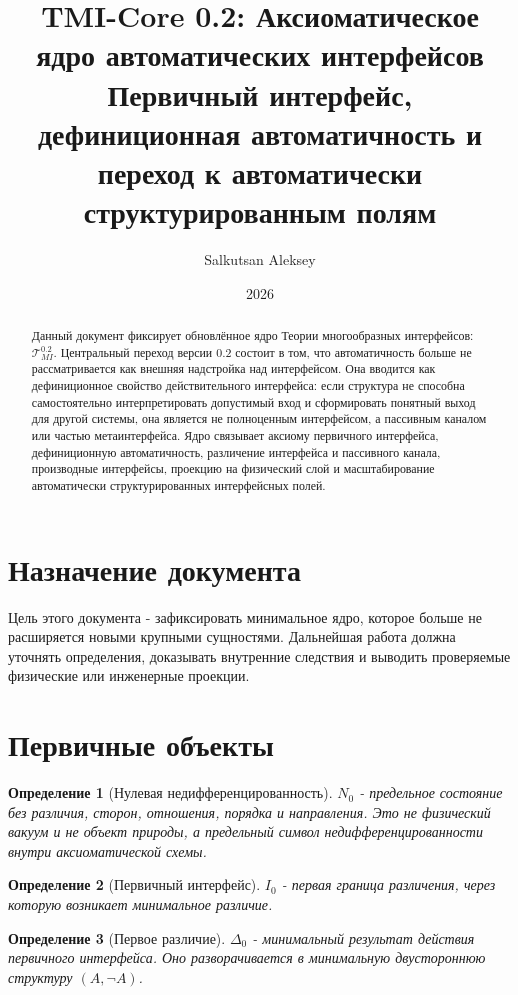 \documentclass[12pt,a4paper]{article}
\title{\textbf{TMI-Core 0.2: Аксиоматическое ядро автоматических интерфейсов}\\
\large Первичный интерфейс, дефиниционная автоматичность и переход к автоматически структурированным полям}
\author{Salkutsan Aleksey}
\date{2026}
\newtheorem{definition}{Определение}
\begin{document}
\maketitle
\begin{abstract}
Данный документ фиксирует обновлённое ядро Теории многообразных интерфейсов: \(\mathcal T_{MI}^{0.2}\). Центральный переход версии 0.2 состоит в том, что автоматичность больше не рассматривается как внешняя надстройка над интерфейсом. Она вводится как дефиниционное свойство действительного интерфейса: если структура не способна самостоятельно интерпретировать допустимый вход и сформировать понятный выход для другой системы, она является не полноценным интерфейсом, а пассивным каналом или частью метаинтерфейса. Ядро связывает аксиому первичного интерфейса, дефиниционную автоматичность, различение интерфейса и пассивного канала, производные интерфейсы, проекцию на физический слой и масштабирование автоматически структурированных интерфейсных полей.
\end{abstract}
\tableofcontents
\newpage

\section{Назначение документа}
Цель этого документа - зафиксировать минимальное ядро, которое больше не расширяется новыми крупными сущностями. Дальнейшая работа должна уточнять определения, доказывать внутренние следствия и выводить проверяемые физические или инженерные проекции.

\section{Первичные объекты}
\begin{definition}[Нулевая недифференцированность]
\(N_0\) - предельное состояние без различия, сторон, отношения, порядка и направления. Это не физический вакуум и не объект природы, а предельный символ недифференцированности внутри аксиоматической схемы.
\end{definition}

\begin{definition}[Первичный интерфейс]
\(I_0\) - первая граница различения, через которую возникает минимальное различие.
\end{definition}

\begin{definition}[Первое различие]
\(\Delta_0\) - минимальный результат действия первичного интерфейса. Оно разворачивается в минимальную двустороннюю структуру \((A,\neg A)\).
\end{definition}
\end{document}
